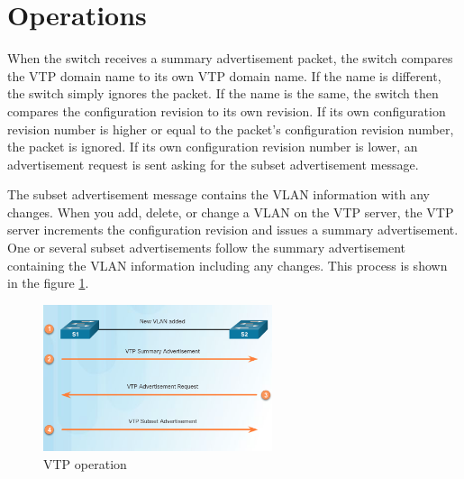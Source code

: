 \section{Operations}
When the switch receives a summary advertisement packet, the switch compares the VTP domain name to its own VTP domain name. If the name is different, the switch simply ignores the packet. If the name is the same, the switch then compares the configuration revision to its own revision. If its own configuration revision number is higher or equal to the packet's configuration revision number, the packet is ignored. If its own configuration revision number is lower, an advertisement request is sent asking for the subset advertisement message.
\par 
The subset advertisement message contains the VLAN information with any changes. When you add, delete, or change a VLAN on the VTP server, the VTP server increments the configuration revision and issues a summary advertisement. One or several subset advertisements follow the summary advertisement containing the VLAN information including any changes. This process is shown in the figure \ref{VTP-operation}.
\begin{figure}[hbtp]
\centering
\includegraphics[width=0.6\textwidth]{pictures/VTP-operation.png}
\caption{VTP operation}
\label{VTP-operation}
\end{figure}
